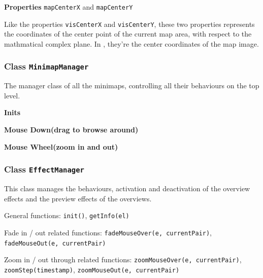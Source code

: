 \textbf{Properties} \texttt{mapCenterX} and \texttt{mapCenterY}

Like the properties \texttt{visCenterX} and \texttt{visCenterY}, these two properties represents the coordinates of the center point of the current \gls{map} area, with respect to the mathmatical complex plane. In , they're the center coordinates of the \gls{map} image.

\subsubsection{Class \texttt{MinimapManager}}\label{chap4:minimapmanager}

The manager class of all the minimaps, controlling all their behaviours on the top level.

\textbf{Inits}




\textbf{Mouse Down(drag to browse around)}






\textbf{Mouse Wheel(zoom in and out)}






\subsubsection{Class \texttt{EffectManager}}\label{chap4:effectmanager}

This class manages the behaviours, activation and deactivation of the overview effects and the preview effects of the overviews.

General functions: \texttt{init()}, \texttt{getInfo(el)}

Fade in / out related functions: \texttt{fadeMouseOver(e, currentPair)}, \texttt{fadeMouseOut(e, currentPair)}

Zoom in / out through related functions: \texttt{zoomMouseOver(e, currentPair)}, \texttt{zoomStep(timestamp)}, \texttt{zoomMouseOut(e, currentPair)}

